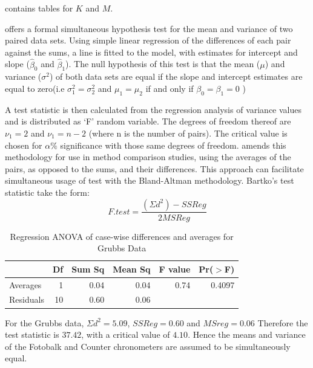 \documentclass[12pt, a4paper]{article}
\begin{document}
\citet{Thompson} contains tables for $K$ and $M$.

\citet{BB89} offers a formal simultaneous hypothesis test for the
mean and variance of two paired data sets. Using simple linear
regression of the differences of each pair against the sums, a
line is fitted to the model, with estimates for intercept and
slope ($\hat{\beta}_{0}$ and $\hat{\beta}_{1}$). The null
hypothesis of this test is that the mean ($\mu$) and variance
($\sigma^{2}$) of both data sets are equal if the slope and
intercept estimates are equal to zero(i.e $\sigma^{2}_{1} =
\sigma^{2}_{2}$ and $\mu_{1}=\mu_{2}$ if and only if $\beta_{0}=
\beta_{1}=0$ )

A test statistic is then calculated from the regression analysis
of variance values \citep{BB89} and is distributed as `F' random
variable. The degrees of freedom thereof are $\nu_{1}=2$ and
$\nu_{1}=n-2$ (where n is the number of pairs). The critical value
is chosen for $\alpha\%$ significance with those same degrees of
freedom. \citet{Bartko} amends this methodology for use in method
comparison studies, using the averages of the pairs, as opposed to
the sums, and their differences. This approach can facilitate
simultaneous usage of test with the Bland-Altman methodology.
Bartko's test statistic take the form:
\begin{equation} F.test = \frac{(\Sigma d^{2})-SSReg}{2MSReg}
\end{equation}
\begin{table}[ht]
\begin{center}
\begin{tabular}{lrrrrr}
  \hline
 & Df & Sum Sq & Mean Sq & F value & Pr($>$F) \\
  \hline
Averages & 1 & 0.04 & 0.04 & 0.74 & 0.4097 \\
  Residuals & 10 & 0.60 & 0.06 &  &  \\
   \hline
\end{tabular}
\caption{Regression ANOVA of case-wise differences and averages
for Grubbs Data}
\end{center}
\end{table}

For the Grubbs data, $\Sigma d^{2}=5.09 $, $SSReg = 0.60$ and
$MSreg=0.06$ Therefore the test statistic is $37.42$, with a
critical value of $4.10$. Hence the means and variance of the
Fotobalk and Counter chronometers are assumed to be simultaneously
equal.
\end{document}
